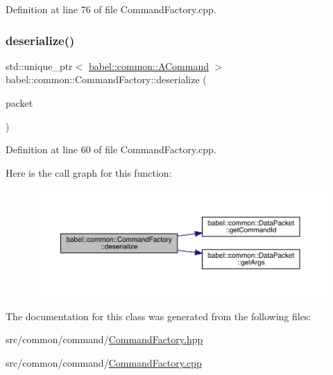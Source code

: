 Definition at line 76 of file Command\+Factory.\+cpp.

\mbox{\label{classbabel_1_1common_1_1_command_factory_acc85d28a39f2a59ae5358d858d61eaa7}} 
\subsubsection{\texorpdfstring{deserialize()}{deserialize()}}
{\footnotesize\ttfamily std\+::unique\+\_\+ptr$<$ \mbox{\hyperlink{classbabel_1_1common_1_1_a_command}{babel\+::common\+::\+A\+Command}} $>$ babel\+::common\+::\+Command\+Factory\+::deserialize (\begin{DoxyParamCaption}\item[{\mbox{\hyperlink{classbabel_1_1common_1_1_data_packet}{Data\+Packet}} \&}]{packet }\end{DoxyParamCaption})}



Definition at line 60 of file Command\+Factory.\+cpp.

Here is the call graph for this function\+:\nopagebreak
\begin{figure}[H]
\begin{center}
\leavevmode
\includegraphics[width=350pt]{classbabel_1_1common_1_1_command_factory_acc85d28a39f2a59ae5358d858d61eaa7_cgraph}
\end{center}
\end{figure}


The documentation for this class was generated from the following files\+:\begin{DoxyCompactItemize}
\item 
src/common/command/\mbox{\hyperlink{_command_factory_8hpp}{Command\+Factory.\+hpp}}\item 
src/common/command/\mbox{\hyperlink{_command_factory_8cpp}{Command\+Factory.\+cpp}}\end{DoxyCompactItemize}
